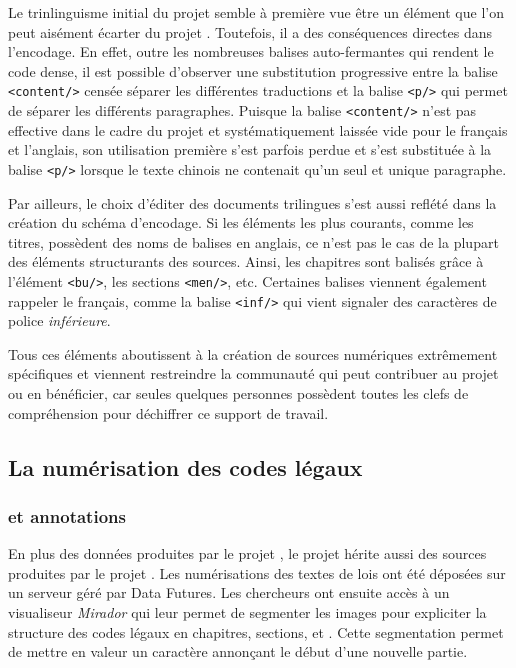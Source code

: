 Le trinlinguisme initial du projet \LSC semble à première vue être un élément que l'on peut aisément écarter du projet \COREL. Toutefois, il a des conséquences directes dans l'encodage. En effet, outre les nombreuses balises auto-fermantes qui rendent le code dense, il est possible d'observer une substitution progressive entre la balise \texttt{<content/>} censée séparer les différentes traductions et la balise \texttt{<p/>} qui permet de séparer les différents paragraphes. Puisque la balise \texttt{<content/>} n'est pas effective dans le cadre du projet \COREL et systématiquement laissée vide pour le français et l'anglais, son utilisation première s'est parfois perdue et s'est substituée à la balise \texttt{<p/>} lorsque le texte chinois ne contenait qu'un seul et unique paragraphe. 

Par ailleurs, le choix d'éditer des documents trilingues s'est aussi reflété dans la création du schéma d'encodage. Si les éléments les plus courants, comme les titres, possèdent des noms de balises en anglais, ce n'est pas le cas de la plupart des éléments structurants des sources. Ainsi, les chapitres sont balisés grâce à l'élément \texttt{<bu/>}, les sections \texttt{<men/>}, etc. Certaines balises viennent également rappeler le français, comme la balise \texttt{<inf/>} qui vient signaler des caractères de police \textit{inférieure}. 

Tous ces éléments aboutissent à la création de sources numériques extrêmement spécifiques et viennent restreindre la communauté qui peut contribuer au projet ou en bénéficier, car seules quelques personnes possèdent toutes les clefs de compréhension pour déchiffrer ce support de travail. 

\subsection{La numérisation des codes légaux}
\subsubsection{\IIIF et annotations}
En plus des données produites par le projet \LSC, le projet \COREL hérite aussi des sources produites par le projet \EPJ. Les numérisations des textes de lois ont été déposées sur un serveur \IIIF géré par Data Futures. Les chercheurs ont ensuite accès à un visualiseur \textit{Mirador} qui leur permet de segmenter les images pour expliciter la structure des codes légaux en chapitres, sections, \lu et \li. Cette segmentation permet de mettre en valeur un caractère annonçant le début d'une nouvelle partie. 

